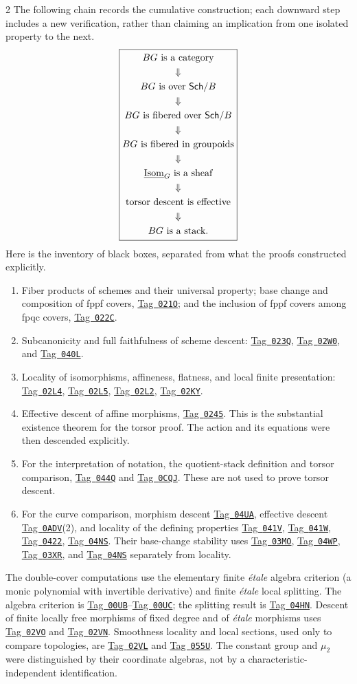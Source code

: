 \documentclass[12pt]{memoir}
\newcommand{\BGtag}[1]{\href{https://stacks.math.columbia.edu/tag/#1}{Tag~\texttt{#1}}}
\begin{document}
\begin{multicols}{2}
The following chain records the cumulative construction; each downward
step includes a new verification, rather than claiming an implication
from one isolated property to the next.
\[
\boxed{\begin{gathered}
 BG\text{ is a category}\\ \Downarrow\\
 BG\text{ is over }\mathsf{Sch}/B\\ \Downarrow\\
 BG\text{ is fibered over }\mathsf{Sch}/B\\ \Downarrow\\
 BG\text{ is fibered in groupoids}\\ \Downarrow\\
 \underline{\operatorname{Isom}}_G\text{ is a sheaf}\\ \Downarrow\\
 \text{torsor descent is effective}\\ \Downarrow\\
 BG\text{ is a stack}.
\end{gathered}}
\]
Here is the inventory of black boxes, separated from what the proofs
constructed explicitly.
\begin{enumerate}[label=(\arabic*)]
\item Fiber products of schemes and their universal property; base
change and composition of fppf covers, \BGtag{021O}; and the inclusion
of fppf covers among fpqc covers, \BGtag{022C}.
\item Subcanonicity and full faithfulness of scheme descent:
\BGtag{023Q}, \BGtag{02W0}, and \BGtag{040L}.
\item Locality of isomorphisms, affineness, flatness, and local finite
presentation: \BGtag{02L4}, \BGtag{02L5}, \BGtag{02L2}, \BGtag{02KY}.
\item Effective descent of affine morphisms, \BGtag{0245}. This is the
substantial existence theorem for the torsor proof. The action and its
equations were then descended explicitly.
\item For the interpretation of notation, the quotient-stack
definition and torsor comparison, \BGtag{044Q} and \BGtag{0CQJ}.
These are not used to prove torsor descent.
\item For the curve comparison, morphism descent \BGtag{04UA},
effective descent \BGtag{0ADV}(2), and locality of the defining
properties \BGtag{041V}, \BGtag{041W}, \BGtag{0422}, \BGtag{04NS}.
Their base-change stability uses \BGtag{03MO}, \BGtag{04WP},
\BGtag{03XR}, and \BGtag{04NS} separately from locality.
\end{enumerate}
The double-cover computations use the elementary finite
\emph{\'etale} algebra criterion (a monic polynomial with invertible
derivative) and finite \emph{\'etale} local splitting. The
algebra criterion is \BGtag{00UB}--\BGtag{00UC}; the splitting result
is \BGtag{04HN}. Descent of finite locally free morphisms of fixed
degree and of \emph{\'etale} morphisms uses \BGtag{02VO} and
\BGtag{02VN}. Smoothness locality and local sections, used only to
compare topologies, are \BGtag{02VL} and \BGtag{055U}. The constant
group and $\mu_2$ were distinguished by their coordinate algebras, not
by a characteristic-independent identification.


\end{multicols}
\end{document}
